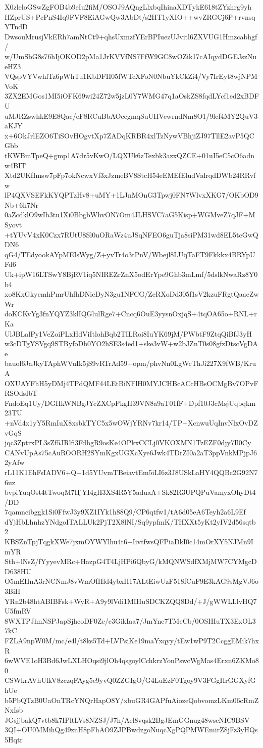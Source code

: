 X0zleloGSwZgFOB4b9eIu2fiM/OSOJ9AQngLlxbqIhinaXDTykE618tZYzhrg9yh
HZprUS+PcPnS4Iq9FVF8EiAGwQw3AbDt/s2HT1yXIO++wvZRGCj6P+rvnsqYTndD
DwsouMrusjVkERh7amNtCt9+qhsUxmzfYErBPIuezUJvitl6ZXVUG1Hmzcabhgf/
w/UmSbG8s76hIjOKOD2pMa1JrKVVfNS7FfW9GC8wOZik17cAIqydDGEJszNueHZ3
VQspVYVwhlTz6pWhTu1KbDFII05fWTcXFoN0NbuYkCkZi4/Vy7IrEyt8wjNPMVoK
3ZX2EMGos1MI5iOFK69wi24Z72w5jzL0Y7WMG47q1aOskZS8fqdLYcf1ed2xBDFU
uMJRZswhkE9E8Qac/eF8RCuBbAOcegmqSuUHVcwrndNm8O1/9lcf4MY2QuV3aKJY
x+6OkJrlEZO6TiSOvHOgvtXp7ZADqKRBR4xlTzNywVBhjiZJ97TllE2avP5QCGbb
tKWBmTpeQ+gmp1A7dr5vKwO/LQXUk6zTexbk3azxQZCE+01uI5eC5cO6adnw4BIT
Xtd2UKfImsw7pFp7okNcwxVf3xJzmeBV8StcH54eEMEfEludValrqdDWb24RRvfw
lP4QXVSEFkKYQPTzHv8+uMY+1LJnMOnG3Tpwj0FN7WlvxXKG7/OKbOD9Nb+6h7Nr
0aZcdklO9wIb3tu1Xi0BbgbWhvON7Om4JLHSVC7aG5Kisp+WGMveZ7qJF+MSyovt
+tYUvV4xK0Czx7RUtU8Sl0uORaWz4uJSqNFEO6guTja8siPM31wd8EL5tcGwQDN6
qG4/TEdyookAYpMEIsWyg/Z+yvTr4o3tPnV/Wbejl8LUqTaFT9Fkkkx4BRYpUFd6
Uk+ipW16LTSwY8BjRV1iq5NIREZrZnX5odErYpe9Ghb3mLmf/5dslkNwaRz8Y0b4
xo8KxGkycmhPmrUhfhDNicDyN3gu1NFCG/ZeRXoDd305f1sV2kzuFRgtQaaeZwWr
doKCKvYg3fnYQYZ3klIQGlulRge7+Cncq6OuE3yysnOxjqS+4tqOA65o+RNL+rKa
UlJBLalPy1VeZoiPLxHdViItlohBqb2TILRoi8IuYK69jM/PWbtF9ZtqQiBfJ3yH
w3cDTgYSVgq9STByfoDb0YO2hSE3s4ed1+ske3vW+w2bJZnT0s08gfzDtscVgDAe
bauol6JaJkyTAphWVuIk5jS9vRTrAd59+opm/phvNn0LgWcThJi227X9fWB/KruA
OXUAYFhH5yDMj4TPdQMF44LEtBiNFlH0MYJCHBcACcHBsOCMgBv7OPvFRSOdsIbT
FndoEq1Uy/DGHkWNBgJYcZXCpPkgH39VN8a9aT01fF+Dpf10J3cMsjUqbqkm23TU
+nVd4x1yY5RmIuX8xsbkTYC5x5wOWjYRNv7kr14/TP+XcnwuUqInvNlxOvDZvGqS
jqc3ZptrxPL3sZf5JRlfi3FdbgR9osKe4OPkxCCLj0VKOXMN1TzEZF0djy7Il0Cy
CANvUpAs75cAuROORH2SYmKgxUGXcXye6Jwk4TDrZI0a2aT3ppVnkMPjpJ62yAfw
rL11K1EhFsIADV6+Q+1d5YUvmTBeiavtEm5iLI6z3J8USkLaHY4QQBc2G92N76uz
bvpiYuqOst4tTwoqM7HjYI4gH3XS4R5Y5aduaA+Sk82R3UPQPuVamyxOhyDt4/DD
7qamncibggk1Si0FfwJ3y9XZ1IYk1h88Q9/CP6qtfw1/tA6d05eA6Teyh2a6L9Ef
dYjHbLhnhzYNdgoITALLUk2PjT2X8lNI/Sq9ypfmK/THXXt5yKt2yIV2d56sqtb2
KBSZnTpjTqgkXWe7jxmOYWYlhu4t6+IivtfwsQFPiaDkI0c14mOrXY5NJMn9ImYR
Sth+lNsZ/fYyyevMRc+HazpG4T4LjHPi6QbyG/kMQNWSdfXMjMW7CYMgcDD638HU
O5mEHnA3rNCNmJ8vWmOfHld4ybxH17ALtEiwUzF518fCuF9E3kAG9sMgVJ6o3BiH
YRn2b48htABIBFsk+WyR+A9y9lVdi1MIHuSDCKZQQ8Dd/+J/gWWLLlvHQ7U5fmRV
8WXTPJhnNSPJapSjhcoDF0Ze/c3GikIaa7/JmYne7TMeCb/0OSHIuTX3ExOL37kC
FZLA9npW0M/mc/e4l/t8ks5Td+LVPsiKe19maYxqyy/tEw1wP9T2CcggEMik7hxR
6wWVE1oH3Bd6JwLXLHOqsi9jlOh4qsgoylCchkrzYonPswcWgMas4Erxn6ZKMo80
CSWkrAVhUlkV8zczqFAyg5e9yvQ0ZZGIgO/G4LuEzF0Tgoy9V3FGgHrGGXyfGhUe
b5PbQTzB0UaOnTRcYNQrHapO8Y/xbuGR4GAPfuAiozeQobvomzLKm06cRmZNxIsb
JGsjjbakQ7vtb8k7IPltLVs8NZSJ/J7h/Ael8vqsk2BgJEmGGnug48wseNIC9BSV
3QI+OU0MMihQg49znH8pFhAO9ZJPBwdzgoNuqcXgPQPMWEmirZ8jFz3yHQs5Hqtr
